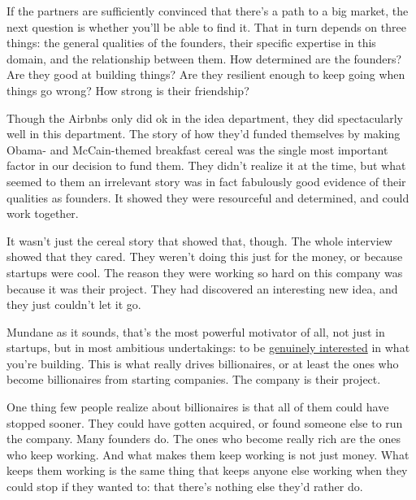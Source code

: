 If the partners are sufficiently convinced that there's a path to a big
market, the next question is whether you'll be able to find it. That in
turn depends on three things: the general qualities of the founders,
their specific expertise in this domain, and the relationship between
them. How determined are the founders? Are they good at building things?
Are they resilient enough to keep going when things go wrong? How strong
is their friendship?

Though the Airbnbs only did ok in the idea department, they did
spectacularly well in this department. The story of how they'd funded
themselves by making Obama- and McCain-themed breakfast cereal was the
single most important factor in our decision to fund them. They didn't
realize it at the time, but what seemed to them an irrelevant story was
in fact fabulously good evidence of their qualities as founders. It
showed they were resourceful and determined, and could work together.

It wasn't just the cereal story that showed that, though. The whole
interview showed that they cared. They weren't doing this just for the
money, or because startups were cool. The reason they were working so
hard on this company was because it was their project. They had
discovered an interesting new idea, and they just couldn't let it go.

Mundane as it sounds, that's the most powerful motivator of all, not
just in startups, but in most ambitious undertakings: to be
\href{genius.html}{genuinely interested} in what you're building. This
is what really drives billionaires, or at least the ones who become
billionaires from starting companies. The company is their project.

One thing few people realize about billionaires is that all of them
could have stopped sooner. They could have gotten acquired, or found
someone else to run the company. Many founders do. The ones who become
really rich are the ones who keep working. And what makes them keep
working is not just money. What keeps them working is the same thing
that keeps anyone else working when they could stop if they wanted to:
that there's nothing else they'd rather do.

